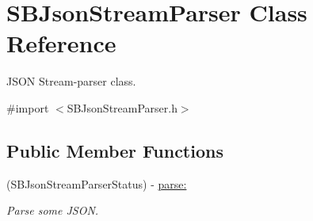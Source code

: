 \hypertarget{interface_s_b_json_stream_parser}{
\section{SBJsonStreamParser Class Reference}
\label{interface_s_b_json_stream_parser}
}


JSON Stream-\/parser class.  




{\ttfamily \#import $<$SBJsonStreamParser.h$>$}

\subsection*{Public Member Functions}
\begin{DoxyCompactItemize}
\item 
(SBJsonStreamParserStatus) -\/ \hyperlink{interface_s_b_json_stream_parser_a9c4b15221e738a1eb49079e266daa1bf}{parse:}
\begin{DoxyCompactList}\small\item\em Parse some JSON. \item\end{DoxyCompactList}\end{DoxyCompactItemize}
